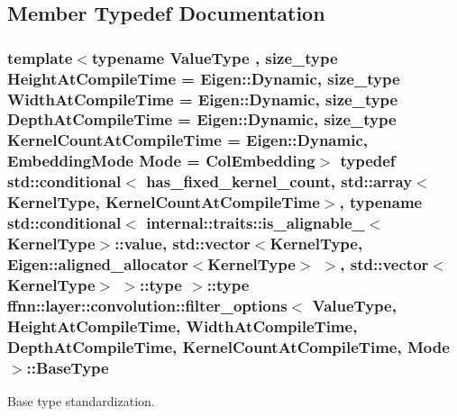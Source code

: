 \subsection{Member Typedef Documentation}
\hypertarget{structffnn_1_1layer_1_1convolution_1_1filter__options_ab77319494179d8d17f91f128232e79cf}{
\subsubsection[{Base\-Type}]{\setlength{\rightskip}{0pt plus 5cm}template$<$typename Value\-Type , size\-\_\-type Height\-At\-Compile\-Time = Eigen\-::\-Dynamic, size\-\_\-type Width\-At\-Compile\-Time = Eigen\-::\-Dynamic, size\-\_\-type Depth\-At\-Compile\-Time = Eigen\-::\-Dynamic, size\-\_\-type Kernel\-Count\-At\-Compile\-Time = Eigen\-::\-Dynamic, Embedding\-Mode Mode = Col\-Embedding$>$ typedef std\-::conditional$<$ {\bf has\-\_\-fixed\-\_\-kernel\-\_\-count}, std\-::array$<${\bf Kernel\-Type}, Kernel\-Count\-At\-Compile\-Time$>$, typename std\-::conditional$<$ {\bf internal\-::traits\-::is\-\_\-alignable\-\_}$<${\bf Kernel\-Type}$>$\-::value, std\-::vector$<${\bf Kernel\-Type}, Eigen\-::aligned\-\_\-allocator$<${\bf Kernel\-Type}$>$ $>$, std\-::vector$<${\bf Kernel\-Type}$>$ $>$\-::type $>$\-::type {\bf ffnn\-::layer\-::convolution\-::filter\-\_\-options}$<$ Value\-Type, Height\-At\-Compile\-Time, Width\-At\-Compile\-Time, Depth\-At\-Compile\-Time, Kernel\-Count\-At\-Compile\-Time, Mode $>$\-::{\bf Base\-Type}}}\label{structffnn_1_1layer_1_1convolution_1_1filter__options_ab77319494179d8d17f91f128232e79cf}


Base type standardization. 


